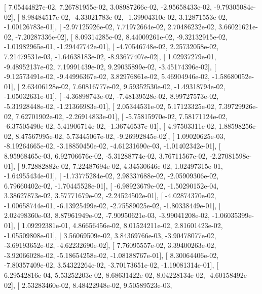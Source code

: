 \documentclass{article}
\begin{document}
       [  7.05444827e-02,   7.26781955e-02,   3.08987266e-02,
         -2.95658433e-02,  -9.79305084e-02],
       [  8.98484517e-02,  -4.33021783e-02,  -1.39904310e-02,
          3.12871553e-02,  -1.00126783e-01],
       [ -2.97125926e-02,   7.71972664e-02,   2.70486232e-02,
          3.66021621e-02,  -7.20287336e-02],
       [  8.09314285e-02,   8.44009261e-02,  -9.32132915e-02,
         -1.01982965e-01,  -1.29447742e-01],
       [ -4.70546748e-02,   2.25732058e-02,   7.21479531e-03,
         -1.64638183e-02,  -8.93677407e-02],
       [  1.02937279e-01,  -9.48952137e-02,   7.19991439e-02,
          9.29035899e-02,  -3.45174396e-02],
       [ -9.12573491e-02,  -9.44996367e-02,   3.82976861e-02,
          5.46904946e-02,  -1.58680052e-01],
       [  2.63406128e-02,   7.60816777e-02,   9.59352530e-02,
         -1.49318794e-02,  -1.05032631e-01],
       [ -4.36898743e-02,  -7.48139528e-02,   8.99727573e-02,
         -5.31928448e-02,  -1.21366983e-01],
       [  2.05344531e-02,   5.17123325e-02,   7.39729926e-02,
          7.62701902e-02,  -2.26914833e-01],
       [ -5.75815970e-02,   7.58171124e-02,  -6.37505490e-02,
          5.41906714e-02,  -1.36746537e-01],
       [  4.97503311e-02,   1.88598256e-02,   8.47567995e-02,
          5.73445067e-02,  -9.26992845e-02],
       [  1.09020625e-03,  -8.19264665e-02,  -3.18850450e-02,
         -4.61231690e-03,  -1.01402342e-01],
       [  8.95968465e-03,   6.92706676e-02,  -5.31288774e-02,
          3.76711567e-02,  -2.27081598e-01],
       [  9.72882882e-02,   7.22487694e-02,   4.34530646e-02,
          1.02497315e-01,  -1.64955434e-01],
       [ -1.73775284e-02,   2.98337688e-02,  -2.05909306e-02,
          6.79660402e-02,  -1.70445528e-01],
       [ -6.98923679e-02,  -1.50290152e-04,   3.38627873e-02,
          3.57771679e-02,  -2.24524502e-01],
       [ -4.02874370e-02,  -1.00658744e-01,  -6.13925499e-02,
         -2.75589025e-02,  -1.80338449e-01],
       [  2.02498360e-03,   8.87961949e-02,  -7.90950621e-03,
         -3.99041208e-02,  -1.06035399e-01],
       [  1.09292381e-01,   4.86656456e-02,   8.01524211e-02,
          2.81601423e-02,  -1.05509808e-01],
       [  3.56069509e-02,   3.84369766e-03,  -3.90478077e-02,
         -3.69193652e-02,  -4.62232690e-02],
       [  7.76095557e-02,   3.39400263e-02,  -3.92066028e-02,
         -5.18654258e-02,  -1.08188767e-01],
       [  8.30064406e-02,  -7.80357409e-02,   3.54322264e-02,
         -3.70173651e-02,  -1.19081314e-01],
       [  6.29542816e-04,   5.53252203e-02,   8.68631422e-02,
          8.04228134e-02,  -4.60158492e-02],
       [  2.53283460e-02,   8.48422948e-02,   9.50589523e-03,
\end{document}

